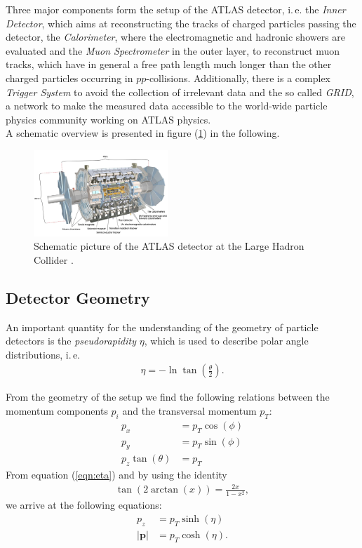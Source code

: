 \documentclass[twocolumn,
			   showpacs,%
               nofootinbib,
               aps,%
               prd,
               notitlepage,
               showkeys,
               10pt]{revtex4-1}
\begin{document}
Three major components form the setup of the ATLAS detector, i.\,e. the \textit{Inner Detector}, which aims at reconstructing the tracks of charged particles passing the detector, the \textit{Calorimeter}, where the electromagnetic and hadronic showers are evaluated and the \textit{Muon Spectrometer} in the outer layer, to reconstruct muon tracks, which have in general a free path length much longer than the other charged particles occurring in $pp$-collisions. Additionally, there is a complex \textit{Trigger System} to avoid the collection of irrelevant data and the so called \textit{GRID}, a network to make the measured data accessible to the world-wide particle physics community working on ATLAS physics. \\
A schematic overview is presented in figure (\ref{fig:atlas}) in the following.
\begin{figure}[H]
\centering
\includegraphics[width=0.45\textwidth]{figures/introduction/atlas}
\caption[Schematic picture of the ATLAS detector at the LHC.]{Schematic picture of the ATLAS detector at the Large Hadron Collider \cite{ATLAS}.}
\label{fig:atlas}
\end{figure}

\subsection{Detector Geometry}
An important quantity for the understanding of the geometry of particle detectors is the \textit{pseudorapidity} $\eta$, which is used to describe polar angle distributions, i.\,e.
\begin{align}
\eta = -\ln \tan(\frac{\theta}{2}).	\label{eqn:eta}
\end{align}

From the geometry of the setup we find the following relations between the momentum components $p_i$ and the transversal momentum $p_T$:
\begin{align}
	p_x &= p_T \cos(\phi)\\
	p_y &= p_T \sin(\phi)\\
	p_z \tan(\theta) &= p_T
\end{align}
From equation (\ref{eqn:eta}) and by using the identity
\begin{align*}
\tan(2\arctan(x)) = \frac{2x}{1 - x^2},
\end{align*} 
we arrive at the following equations:
\begin{align}
	p_z &= p_T\sinh(\eta)\\
	\left|\mathbf{p}\right| &= p_T \cosh(\eta).
\end{align}
\end{document}
